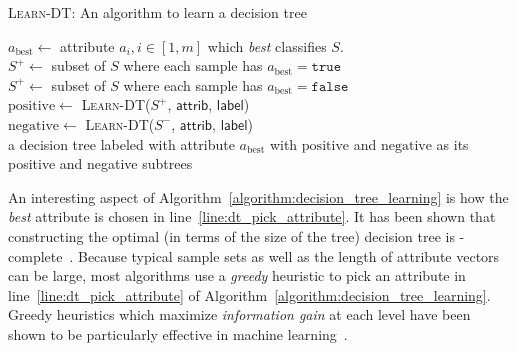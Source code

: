 \begin{algorithm}[!t]
\caption{\textsc{Learn-DT}: An algorithm to learn a decision tree}
\label{algorithm:decision_tree_learning}
\DontPrintSemicolon
{}
$a_{\mathrm{best}} \leftarrow$ attribute $a_i, i \in [1, m]$ which \emph{best}
classifies $S$.
\label{line:dt_pick_attribute}\\
$S^+ \leftarrow $ subset of $S$ where each sample has
$a_{\mathrm{best}} = \mathtt{true}$\\
$S^+ \leftarrow $ subset of $S$ where each sample has
$a_{\mathrm{best}} = \mathtt{false}$\\
$\mathrm{positive} \leftarrow $ \textsc{Learn-DT}($S^+$,
$\mathsf{attrib}$, $\mathsf{label}$)\\
$\mathrm{negative} \leftarrow $ \textsc{Learn-DT}($S^-$,
$\mathsf{attrib}$, $\mathsf{label}$)\\
\Return a decision tree labeled with attribute $a_{\mathrm{best}}$
with $\mathrm{positive}$ and $\mathrm{negative}$ as its positive and
negative subtrees
\end{algorithm}
An interesting aspect of
Algorithm~\ref{algorithm:decision_tree_learning} is how the
\emph{best} attribute is chosen in
line~\ref{line:dt_pick_attribute}. It has been shown that constructing
the optimal (in terms of the size of the tree) decision tree is
-complete~\cite{hyafil-76, murthy-98}. Because typical
sample sets as well as the length of attribute vectors can be large,
most algorithms use a \emph{greedy} heuristic to pick an attribute in
line~\ref{line:dt_pick_attribute} of
Algorithm~\ref{algorithm:decision_tree_learning}.  Greedy heuristics
which maximize \emph{information gain} at each level have been shown
to be particularly effective in machine learning~\cite{quinlan-86,
quinlan-87, quinlan-96}.

